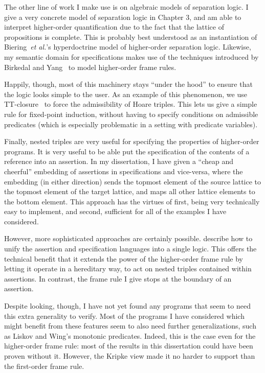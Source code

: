 The other line of work I make use is on algebraic models of separation
logic. I give a very concrete model of separation logic in Chapter 3,
and am able to interpret higher-order quantification due to the fact
that the lattice of propositions is complete. This is probably best
understood as an instantiation of Biering~\emph{et al.}'s
hyperdoctrine model of higher-order separation logic. Likewise, my
semantic domain for specifications makes use of the techniques
introduced by Birkedal and Yang~\cite{birkedal-yang} to model
higher-order frame rules.

Happily, though, most of this machinery stays ``under the hood'' to
ensure that the logic looks simple to the user.  As an example of this
phenomenon, we use TT-closure~\cite{tt-closure} to force the
admissibility of Hoare triples. This lets us give a simple rule for
fixed-point induction, without having to specify conditions on
admissible predicates (which is especially problematic in a setting
with predicate variables).

Finally, nested triples are very useful for specifying the properties
of higher-order programs. It is very useful to be able put the
specification of the contents of a reference into an assertion.  In my
dissertation, I have given a ``cheap and cheerful'' embedding of
assertions in specifications and vice-versa, where the embedding (in
either direction) sends the topmost element of the source lattice to
the topmost element of the target lattice, and maps all other lattice
elements to the bottom element. This approach has the virtues of
first, being very technically easy to implement, and second,
sufficient for all of the examples I have considered.

However, more sophisticated approaches are certainly
possible. \citet{nested-hoare-triples} describe how to unify the
assertion and specification languages into a single logic.  This
offers the technical benefit that it extends the power of the
higher-order frame rule by letting it operate in a hereditary way, to
act on nested triples contained within assertions. In contrast, the
frame rule I give stops at the boundary of an assertion. 

Despite looking, though, I have not yet found any programs that seem
to need this extra generality to verify. Most of the programs I have
considered which might benefit from these features seem to also need
further generalizations, such as Liskov and Wing's monotonic
predicates. Indeed, this is the case even for the higher-order frame
rule: most of the results in this dissertation could have been proven
without it. However, the Kripke view made it no harder to support than
the first-order frame rule.

